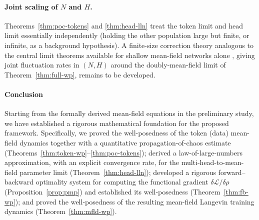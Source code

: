 \documentclass[11pt,a4wide]{article}
\theoremstyle{definition}
\begin{document}
\paragraph{Joint scaling of $N$ and $H$.} Theorems~\ref{thm:poc-tokens} and \ref{thm:head-lln} treat the token limit and head limit essentially independently (holding the other population large but finite, or infinite, as a background hypothesis). A finite-size correction theory analogous to the central limit theorems available for shallow mean-field networks alone \cite{mei2018meanfield}, giving joint fluctuation rates in $(N,H)$ around the doubly-mean-field limit of Theorem~\ref{thm:full-wp}, remains to be developed.

\paragraph{Conclusion}

Starting from the formally derived mean-field equations in the preliminary study, we have established a rigorous mathematical foundation for the proposed framework. Specifically, we proved the well-posedness of the token (data) mean-field dynamics together with a quantitative propagation-of-chaos estimate (Theorems~\ref{thm:token-wp}--\ref{thm:poc-tokens}); derived a law-of-large-numbers approximation, with an explicit convergence rate, for the multi-head-to-mean-field parameter limit (Theorem~\ref{thm:head-lln}); developed a rigorous forward--backward optimality system for computing the functional gradient $\delta\mathcal L/\delta\rho$ (Proposition~\ref{prop:pmp}) and established its well-posedness (Theorem~\ref{thm:fb-wp}); and proved the well-posedness of the resulting mean-field Langevin training dynamics (Theorem~\ref{thm:mfld-wp}).
\end{document}
